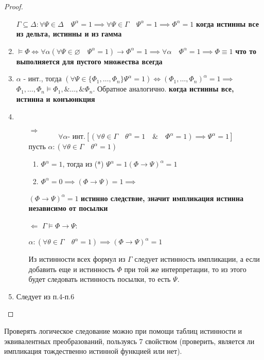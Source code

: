 \documentclass[a4paper]{article}
\theoremstyle{definition}
\theoremstyle{remark}
\begin{document}
\begin{proof}
\begin{enumerate}
            $\Gamma \subseteq \Delta: \forall\Psi\in\Delta \quad \Psi^\alpha = 1\implies \forall\Psi\in\Gamma \quad \Psi^\alpha = 1\implies \Phi^\alpha = 1$
            \textbf{когда истинны все из дельта, истинны и из гамма}
            \item $\models \Phi \Leftrightarrow \forall \alpha (\forall \Psi \in \varnothing\quad \Psi^\alpha = 1)\to \Phi^\alpha = 1 \implies \forall \alpha \quad \Phi^\alpha = 1\implies \Phi \equiv 1$
            \textbf{что то выполняется для пустого множества всегда}
            \item $\alpha$ - инт., тогда $(\forall \Psi \in \{ \Phi_1, \dots, \Phi_n\} \Psi^\alpha = 1)\Leftrightarrow (\Phi_1, \dots, \Phi_n)^\alpha = 1\implies$
            $\Phi_1, \dots, \Phi_n\models \Phi_1,\& \dots,\& \Phi_n$.
            Обратное аналогично. \textbf{когда истинны все, истинна и конъюнкция}
            \item \begin{itemize}
                \item[$\Rightarrow$]
                    \begin{equation}
                        \forall \alpha \text{- инт.}[(\forall \theta \in \Gamma\quad \theta^\alpha = 1\quad \&\quad \Phi^\alpha = 1)\implies \Psi^\alpha = 1]\tag{*}
                    \end{equation}    
                    пусть $\alpha: (\forall \theta \in \Gamma \quad \theta^\alpha = 1)$  
                    \begin{enumerate}
                        \item $\Phi^\alpha= 1$, тогда из (*) $\Psi^\alpha = 1 (\Phi\to \Psi)^\alpha = 1$
                        \item $\Phi^\alpha = 0\implies (\Phi\to\Psi) = 1\implies$
                    \end{enumerate}     
                    $(\Phi\to \Psi)^\alpha = 1$ \textbf{истинно следствие, значит импликация истинна независимо от посылки}
                \item[$\Leftarrow$] $\Gamma \models \Phi\to \Psi:$
                
                $\alpha: (\forall \theta \in \Gamma \quad \theta^\alpha = 1)\implies (\Phi\to \Psi)^\alpha = 1$

                Из истинности всех формул из $\Gamma$ следует истинность импликации, а если добавить еще и 
                истинность $\Phi$ при той же интерпретации, то из этого будет следовать истинность посылки, то есть $\Psi$.  
            \end{itemize}
            \item Следует из п.4-п.6
        \end{enumerate}
    \end{proof}
    Проверять логическое следование можно при помощи таблиц истинности и эквивалентных преобразований, пользуясь 7 свойством
    (проверить, является ли импликация тождественно истинной функцией или нет).
\end{document}
